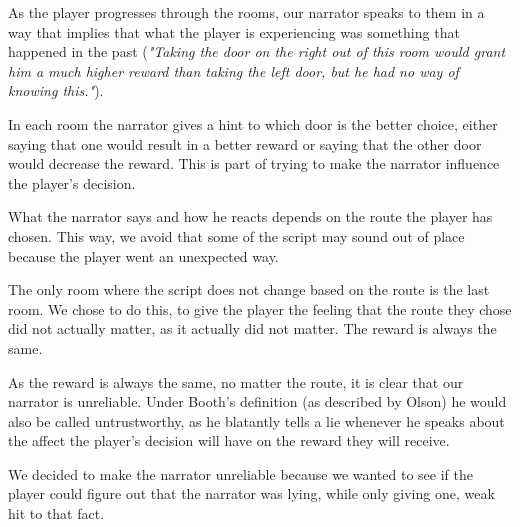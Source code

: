 As the player progresses through the rooms, our narrator speaks to them in a way that implies that what the player is experiencing was something that happened in the past (\textit{"Taking the door on the right out of this room would grant him a much higher reward than taking the left door, but he had no way of knowing this."}).

In each room the narrator gives a hint to which door is the better choice, either saying that one would result in a better reward or saying that the other door would decrease the reward. This is part of trying to make the narrator influence the player's decision.

What the narrator says and how he reacts depends on the route the player has chosen. This way, we avoid that some of the script may sound out of place because the player went an unexpected way.

The only room where the script does not change based on the route is the last room. We chose to do this, to give the player the feeling that the route they chose did not actually matter, as it actually did not matter. The reward is always the same.

As the reward is always the same, no matter the route, it is clear that our narrator is unreliable. Under Booth's definition (as described by Olson\cite{Olson}) he would also be called untrustworthy, as he blatantly tells a lie whenever he speaks about the affect the player's decision will have on the reward they will receive.

We decided to make the narrator unreliable because we wanted to see if the player could figure out that the narrator was lying, while only giving one, weak hit to that fact.
